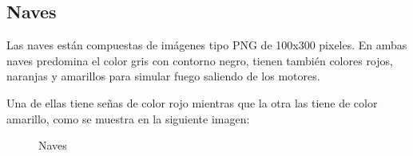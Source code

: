 \documentclass[12pt,letterpaper]{report}
\begin{document}
\subsection{Naves}
Las naves están compuestas de imágenes tipo PNG de 100x300 pixeles. En ambas naves predomina el color gris con contorno negro, tienen también colores rojos, naranjas y amarillos para simular fuego saliendo de los motores. 

Una de ellas tiene señas de color rojo mientras que la otra las tiene de color amarillo, como se muestra en la siguiente imagen:
\begin{center}
\begin{figure}[h]
 \centering
 \caption{Naves}
 \label{f:naves}
\end{figure}
\end{center}
\end{document}
